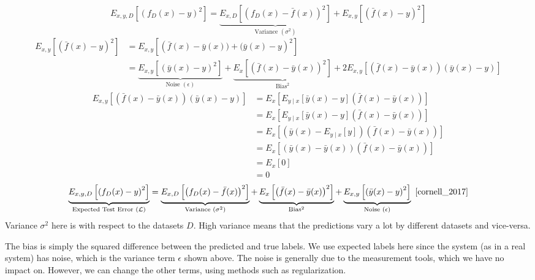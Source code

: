 \documentclass{article}
\numberwithin{equation}{subsection}
\begin{document}
\begin{equation}
	E_{x, y, D} \left[ \left( f_D(x) - y \right)^{2} \right] = \underbrace{E_{x, D} \left[ \left(f_D(x) - \bar{f}(x) \right)^{2} \right]}_{\text{Variance }(\sigma^2)} + E_{x, y}\left[ \left( \bar{f}(x) - y \right)^{2} \right]
\end{equation}
\begin{align}
	E_{x, y} \left[ \left(\bar{f}(x) - y \right)^{2}\right] &= E_{x, y} \left[ \left(\bar{f}(x) -\bar y(x) )+(\bar y(x) - y \right)^{2}\right]  \\
  &=\underbrace{E_{x, y} \left[\left(\bar{y}(x) - y\right)^{2}\right]}_{\text{Noise }(\epsilon)} + \underbrace{E_{x} \left[\left(\bar{f}(x) - \bar{y}(x)\right)^{2}\right]}_\mathrm{Bias^2} + 2 E_{x, y} \left[ \left(\bar{f}(x) - \bar{y}(x)\right)\left(\bar{y}(x) - y\right)\right]
\end{align}
\begin{align}
	E_{x, y} \left[\left(\bar{f}(x) - \bar{y}(x)\right)\left(\bar{y}(x) - y\right)\right] &= E_{x}\left[E_{y \mid x} \left[\bar{y}(x) - y \right] \left(\bar{f}(x) - \bar{y}(x) \right) \right] \\
    &= E_{x} \left[ E_{y \mid x} \left[ \bar{y}(x) - y\right] \left(\bar{f}(x) - \bar{y}(x)\right)\right] \\
    &= E_{x} \left[ \left( \bar{y}(x) - E_{y \mid x} \left [ y \right]\right) \left(\bar{f}(x) - \bar{y}(x)\right)\right] \\
    &= E_{x} \left[ \left( \bar{y}(x) - \bar{y}(x) \right) \left(\bar{f}(x) - \bar{y}(x)\right)\right] \\
    &= E_{x} \left[ 0 \right] \\
    &= 0
\end{align}
\begin{equation}
	\underbrace{E_{x, y, D} \left[\left(f_D(x) - y\right)^{2}\right]}_{\text{Expected Test Error }(\mathcal{L})} = \underbrace{E_{x, D}\left[\left(f_D(x) - \bar{f}(x)\right)^{2}\right]}_{\text{Variance }(\sigma^2)} + \underbrace{E_{x}\left[\left(\bar{f}(x) - \bar{y}(x)\right)^{2}\right]}_\mathrm{Bias^2} + \underbrace{E_{x, y}\left[\left(\bar{y}(x) - y\right)^{2}\right]}_{\text{Noise }(\epsilon)}~\cite{cornell_2017} 
\end{equation}
Variance $\sigma^2$ here is with respect to the datasets $D$. High variance means that the predictions vary a lot by different datasets and vice-versa. 

The bias is simply the squared difference between the predicted and true labels. We use expected labels here since the system (as in a real system) has noise, which is the variance term $\epsilon$ shown above. The noise is generally due to the measurement tools, which we have no impact on. However, we can change the other terms, using methods such as regularization.
\end{document}
